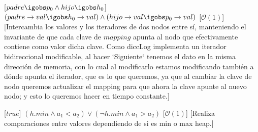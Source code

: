 \begin{Interfaz}
    [$padre \igobs p_0 \wedge hijo \igobs h_0$]
    {$(padre\to val \igobs h_0\to val) \wedge (hijo\to val \igobs p_0\to val)$}
    [$\mathcal{O}(1)$]
    [Intercambia los valores y los iteradores de dos nodos entre sí, manteniendo el invariante de que cada clave de $mapping$ apunta al nodo que efectivamente contiene como valor dicha clave. Como diccLog implementa un iterador bidireccional modificable, al hacer `Siguiente` tenemos el dato en la misma dirección de memoria, con lo cual al modificarlo estamos modificando también a dónde apunta el iterador, que es lo que queremos, ya que al cambiar la clave de nodo queremos actualizar el mapping para que ahora la clave apunte al nuevo nodo; y esto lo queremos hacer en tiempo constante.]

    [$true$]
    {$ (h.min \wedge a_1 < a_2) \lor (\neg h.min \wedge a_1 > a_2) $}
    [$\mathcal{O}(1)$]
    [Realiza comparaciones entre valores dependiendo de si es min o max heap.]


    \begin{tad}
        {}
        \tadOtrasOperaciones
        \tadAxiomas[]
    \end{tad}

\end{Interfaz}